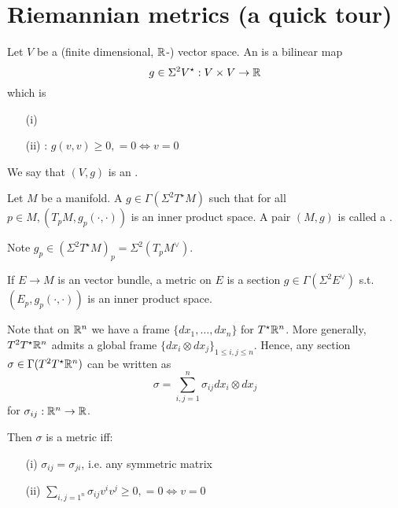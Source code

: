 \chapter{Riemannian metrics (a quick tour)}

\begin{definition*}
    Let \(V\) be a (finite dimensional, \(\mathbb{R}\)-) vector space. An  is a 
    bilinear map
    \[g\in \Sigma^2 V^\star:V\times V\to \mathbb{R}\]
    which is 
    \begin{enumerate}
        \item[(i)]  
        \item[(ii)] : \(g(v,v)\geq 0, =0\iff v=0\) 
    \end{enumerate}
    We say that \((V,g)\) is an .
\end{definition*}

\begin{definition*}
    Let \(M\) be a manifold. A  \(g\in \Gamma(\Sigma^2 T^\star M)\)
    such that for all \(p\in M, (T_pM,g_p(\cdot,\cdot))\) is an inner product space. A pair \((M,g)\)
    is called a .
\end{definition*}

Note \(g_p\in (\Sigma^2T^\star M)_p=\Sigma^2(T_p M^\vee)\). 

\begin{remark}
    If \(E\to M\) is an vector bundle, a metric on \(E\) is a section \(g\in \Gamma(\Sigma^2 E^\vee)\)
    s.t. \((E_p,g_p(\cdot,\cdot))\) is an inner product space.
\end{remark}

Note that on \(\mathbb{R}^n\) we have a frame \(\{dx_1,\dots,dx_n\}\) for \(T^\star \mathbb{R}^n\). More 
generally, \(T^2 T^\star \mathbb{R}^n\) admits a global frame \(\{dx_i\otimes dx_j\}_{1\leq i,j\leq n}\).
Hence, any section \(\sigma\in \Gamma(T^2 T^\star \mathbb{R}^n)\) can be written as 
\[\sigma=\sum_{i,j=1}^n\sigma_{ij}dx_i\otimes dx_j\]
for \(\sigma_{ij}:\mathbb{R}^n\to\mathbb{R}\).

Then \(\sigma\) is a metric iff:
\begin{enumerate}
    \item[(i)] \(\sigma_{ij}=\sigma_{ji}\), i.e. any symmetric matrix 
    \item[(ii)] \(\sum_{i,j=1^n}\sigma_{ij}v^i v^j\geq 0, =0\iff v=0 \)  
\end{enumerate}

